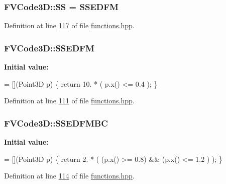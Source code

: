 \subsubsection[{\texorpdfstring{SS}{SS}}]{ F\+V\+Code3\+D\+::\+SS = {\bf S\+S\+E\+D\+FM}}\hypertarget{namespaceFVCode3D_ae8b0f97f0774db9f0881cfc5f31d93f4}{}\label{namespaceFVCode3D_ae8b0f97f0774db9f0881cfc5f31d93f4}


Definition at line \hyperlink{functions_8hpp_source_l00117}{117} of file \hyperlink{functions_8hpp_source}{functions.\+hpp}.

\subsubsection[{\texorpdfstring{S\+S\+E\+D\+FM}{SSEDFM}}]{ F\+V\+Code3\+D\+::\+S\+S\+E\+D\+FM}\hypertarget{namespaceFVCode3D_a57e80824f085310d70ceed215314b9eb}{}\label{namespaceFVCode3D_a57e80824f085310d70ceed215314b9eb}
{\bfseries Initial value\+:}
\begin{DoxyCode}
= [](Point3D p)
    \{ \textcolor{keywordflow}{return} 10. * ( p.x() <= 0.4 ); \}
\end{DoxyCode}


Definition at line \hyperlink{functions_8hpp_source_l00111}{111} of file \hyperlink{functions_8hpp_source}{functions.\+hpp}.

\subsubsection[{\texorpdfstring{S\+S\+E\+D\+F\+M\+BC}{SSEDFMBC}}]{ F\+V\+Code3\+D\+::\+S\+S\+E\+D\+F\+M\+BC}\hypertarget{namespaceFVCode3D_a84fa11f60a0d07f58d20dcd63837a333}{}\label{namespaceFVCode3D_a84fa11f60a0d07f58d20dcd63837a333}
{\bfseries Initial value\+:}
\begin{DoxyCode}
= [](Point3D p)
    \{ \textcolor{keywordflow}{return} 2. * ( (p.x() >= 0.8) && (p.x() <= 1.2 ) ); \}
\end{DoxyCode}


Definition at line \hyperlink{functions_8hpp_source_l00114}{114} of file \hyperlink{functions_8hpp_source}{functions.\+hpp}.

